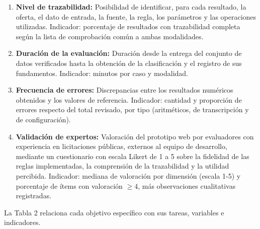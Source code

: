 \documentclass[12pt,a4paper]{article}
\begin{document}
\begin{enumerate}
\item \textbf{Nivel de trazabilidad:} Posibilidad de identificar, para cada resultado, la oferta, el dato de entrada, la fuente, la regla, los parámetros y las operaciones utilizadas. Indicador: porcentaje de resultados con trazabilidad completa según la lista de comprobación común a ambas modalidades.
\item \textbf{Duración de la evaluación:} Duración desde la entrega del conjunto de datos verificados hasta la obtención de la clasificación y el registro de sus fundamentos. Indicador: minutos por caso y modalidad.
\item \textbf{Frecuencia de errores:} Discrepancias entre los resultados numéricos obtenidos y los valores de referencia. Indicador: cantidad y proporción de errores respecto del total revisado, por tipo (aritméticos, de transcripción y de configuración).
\item \textbf{Validación de expertos:} Valoración del prototipo web por evaluadores con experiencia en licitaciones públicas, externos al equipo de desarrollo, mediante un cuestionario con escala Likert de 1 a 5 sobre la fidelidad de las reglas implementadas, la comprensión de la trazabilidad y la utilidad percibida. Indicador: mediana de valoración por dimensión (escala 1-5) y porcentaje de ítems con valoración $\geq 4$, más observaciones cualitativas registradas.
\end{enumerate}

La Tabla 2 relaciona cada objetivo específico con sus tareas, variables e indicadores.
\end{document}
